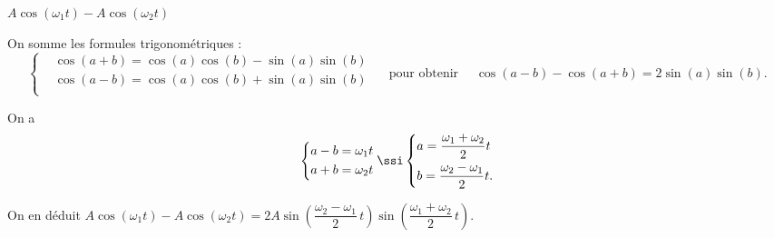 
\begin{enonce}
$A\cos(\omega_1 t)-A\cos(\omega_2 t)$
\end{enonce}


\begin{corrige}
On somme les formules trigonométriques : 
\begin{equation*}
\left\{\begin{aligned}
&\cos(a+b)=\cos(a)\cos(b)-\sin(a)\sin(b)\\
&\cos(a-b)=\cos(a)\cos(b)+\sin(a)\sin(b)\\
\end{aligned}\right.
\quad\text{ pour obtenir }\quad\cos(a-b)-\cos(a+b)=2\sin(a)\sin(b).
\end{equation*}

On a 
\begin{equation*}
\left\{\begin{aligned}
&a-b=\omega_1t\\
&a+b=\omega_2t\\
\end{aligned}\right.\ssi
\left\{\begin{aligned}
&a=\dfrac{\omega_1+\omega_2}{2}t\\
&b=\dfrac{\omega_2-\omega_1}{2}t.
\end{aligned}
\right.
\end{equation*}

On en déduit  $A\cos(\omega_1 t)-A\cos(\omega_2 t)=2A\sin\left(\dfrac{\omega_2-\omega_1}{2}\, t\right)\sin\left(\dfrac{\omega_1+\omega_2}{2}\, t\right)$.
\end{corrige}



\finEntrainement






\newpage









